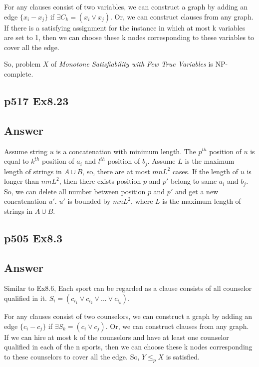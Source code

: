 \documentclass[a4paper]{article}
\begin{document}
For any clauses consist of two variables, we can construct a graph by adding an edge $\{x_i-x_j\}$ if $\exists C_k=(x_i \vee x_j)$. Or, we can construct clauses from any graph. If there is a satisfying assignment for the instance in which at most k variables
are set to 1, then we can choose these k nodes corresponding to these variables to cover all the edge.

So, problem $X$ of \emph{Monotone Satisfiability with Few True Variables} is NP-complete.

\vspace{2cm}


\subsection*{p517 Ex8.23}
\subsection*{Answer}
Assume string $u$ is a concatenation with minimum length. The $p^{th}$ position of $u$ is equal to $k^{th}$ position of $a_i$ and $l^{th}$ position of $b_j$. Assume $L$ is the maximum length of strings in $A\cup B$, so, there are at most $mnL^2$ cases. If the length of $u$ is longer than $mnL^2$, then there exists position $p$ and $p'$ belong to same $a_i$ and $b_j$. So, we can delete all number between position $p$ and $p'$ and get a new concatenation $u'$. $u'$ is bounded by $mnL^2$, where $L$ is the maximum length of strings in $A\cup B$.
\vspace{2cm}


\subsection*{p505 Ex8.3}
\subsection*{Answer}
Similar to Ex8.6, Each sport can be regarded as a clause consists of all counselor qualified in it. $S_i = (c_{i_1}\vee c_{i_2} \vee ... \vee c_{i_k})$.

For any clauses consist of two counselors, we can construct a graph by adding an edge $\{c_i-c_j\}$ if $\exists S_k=(c_i \vee c_j)$. Or, we can construct clauses from any graph. If we can hire at most k of the counselors and have at least one counselor qualified in each of the n sports, then we can choose these k nodes corresponding to these counselors to cover all the edge. So, $Y\leq_pX$ is satisfied.
\end{document}
